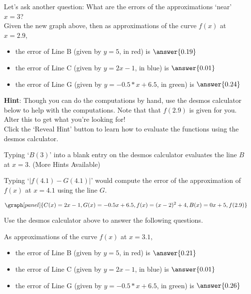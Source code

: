 \documentclass[handout,nooutcomes]{ximera}
\begin{document}
\begin{question}
Let's ask another question: What are the errors of the approximations `near' $x=3$? \\

Given the new graph above, then as approximations of the curve $f(x)$ at {\bf $x=2.9$},
\begin{itemize}
\item the error of Line B (given by $y=5$, in red) is $\answer{0.19}$
\item the error of Line C (given by $y=2x-1$, in blue) is $\answer{0.01}$
\item the error of Line G (given by $y=-0.5*x + 6.5$, in green) is $\answer{0.24}$
\end{itemize}

\textbf{Hint}: Though you can do the computations by hand, use the
desmos calculator below to help with the computations. 
Note that that $f(2.9)$ is given for you. Alter this to get what you're looking for!\\
Click the `Reveal Hint' button to learn how to evaluate the functions using
the desmos calculator.\\
\begin{hint}
Typing `$B(3)$' into a blank entry on the desmos calculator
evaluates the line $B$ at $x=3$. (More Hints Available)
\end{hint}
\begin{hint}
Typing `$|f(4.1) - G(4.1)|$' would compute the error of the approximation
of $f(x)$ at $x=4.1$ using the line $G$.
\end{hint}
\[
\graph[panel]{C(x) = 2x -1, G(x) = -0.5x + 6.5, f(x) = (x - 2)^2 + 4, B(x) = 0x + 5,  f(2.9)}
\]

\medskip

Use the desmos calculator above to answer the following questions.

As approximations of the curve $f(x)$ at {\bf $x=3.1$},\\
\begin{itemize}
\item the error of Line B (given by $y=5$, in red) is $\answer{0.21}$\\
\item the error of Line C (given by $y=2x-1$, in blue) is $\answer{0.01}$\\
\item the error of Line G (given by $y=-0.5*x + 6.5$, in green) is $\answer{0.26}$\\
\end{itemize}
\end{question}
\end{document}
